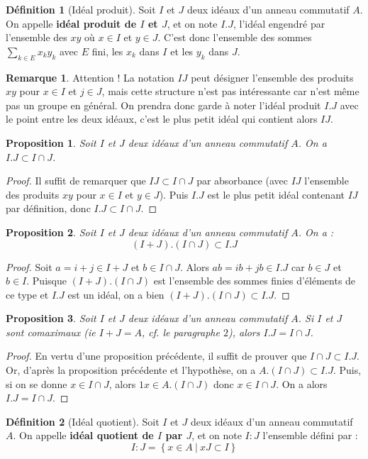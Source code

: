 \documentclass[french]{book}
\theoremstyle{plain}
\newtheorem{prop}{Proposition}[chapter]
\theoremstyle{definition}
\newtheorem{dfn}{Définition}[chapter]
\newtheorem{rmq}{Remarque}[chapter]
\theoremstyle{remark}
\begin{document}
\begin{dfn}[Idéal produit]
	Soit $I$ et $J$ deux idéaux d'un anneau commutatif $A$. On appelle \textbf{idéal produit de $I$ et $J$}, et on note $I.J$, l'idéal engendré par l'ensemble des $xy$ où $x\in I$ et $y\in J$. C'est donc l'ensemble des sommes $\displaystyle\sum_{k\in E}x_ky_k$ avec $E$ fini, les $x_k$ dans $I$ et les $y_k$ dans $J$. 
\end{dfn}
\begin{rmq}
	Attention ! La notation $IJ$ peut désigner l'ensemble des produits $xy$ pour $x\in I$ et $j\in J$, mais cette structure n'est pas intéressante car n'est même pas un groupe en général. On prendra donc garde à noter l'idéal produit $I.J$ avec le point entre les deux idéaux, c'est le plus petit idéal qui contient alors $IJ$.
\end{rmq}
\begin{prop}
	Soit $I$ et $J$ deux idéaux d'un anneau commutatif $A$. On a $I.J\subset I\cap J$.
\end{prop}
\begin{proof}
	Il suffit de remarquer que $IJ\subset I\cap J$ par absorbance (avec $IJ$ l'ensemble des produits $xy$ pour $x\in I$ et $y\in J$). Puis $I.J$ est le plus petit idéal contenant $IJ$ par définition, donc $I.J\subset I\cap J$.
\end{proof}
\begin{prop}
	Soit $I$ et $J$ deux idéaux d'un anneau commutatif $A$. On a : $$(I+J).(I\cap J)\subset I.J$$
\end{prop}
\begin{proof}
	Soit $a=i+j\in I+J$ et $b\in I\cap J$. Alors $ab=ib+jb\in I.J$ car $b\in J$ et $b\in I$. Puisque $(I+J).(I\cap J)$ est l'ensemble des sommes finies d'éléments de ce type et $I.J$ est un idéal, on a bien $(I+J).(I\cap J)\subset I.J$.
\end{proof}
\begin{prop}
	Soit $I$ et $J$ deux idéaux d'un anneau commutatif $A$. Si $I$ et $J$ sont comaximaux (\textit{ie} $I+J=A$, cf. le paragraphe $2$), alors $I.J=I\cap J$.
\end{prop}
\begin{proof}
	En vertu d'une proposition précédente, il suffit de prouver que $I\cap J\subset I.J$. Or, d'après la proposition précédente et l'hypothèse, on a $A.(I\cap J)\subset I.J$. Puis, si on se donne $x\in I\cap J$, alors $1x\in A.(I\cap J)$ donc $x\in I\cap J$. On a alors $I.J=I\cap J$.
\end{proof}
\begin{dfn}[Idéal quotient]
	Soit $I$ et $J$ deux idéaux d'un anneau commutatif $A$. On appelle \textbf{idéal quotient de $I$ par $J$}, et on note $I:J$ l'ensemble défini par : $$I:J=\left\{x\in A\ | \ xJ\subset I\right\}$$
\end{dfn}
\end{document}
